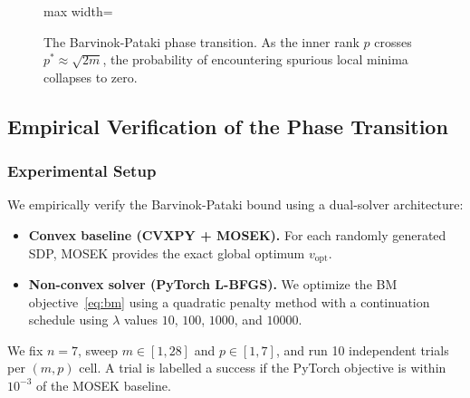 \begin{figure}[H]
  \centering
  \begin{adjustbox}{max width=\columnwidth}
  \end{adjustbox}
  \caption{The Barvinok-Pataki phase transition. As the inner rank $p$ crosses
  $p^* \approx \sqrt{2m}$, the probability of encountering spurious local minima collapses
  to zero.}
  \label{fig:pataki_threshold}
\end{figure}

\subsection{Empirical Verification of the Phase Transition}

\subsubsection{Experimental Setup}
We empirically verify the Barvinok-Pataki bound using a dual-solver
architecture:
\begin{itemize}
  \item \textbf{Convex baseline (CVXPY + MOSEK).} For each randomly generated SDP, MOSEK
        provides the exact global optimum $v_{\text{opt}}$.
  \item \textbf{Non-convex solver (PyTorch L-BFGS).} We optimize the BM
        objective~\eqref{eq:bm} using a quadratic penalty method with a continuation
        schedule using $\lambda$ values $10$, $100$, $1000$, and $10000$.
\end{itemize}
We fix $n = 7$, sweep $m \in [1,28]$ and $p \in [1,7]$, and run 10 independent trials per
$(m,p)$ cell. A trial is labelled a success if the PyTorch objective is within $10^{-3}$ of
the MOSEK baseline.

